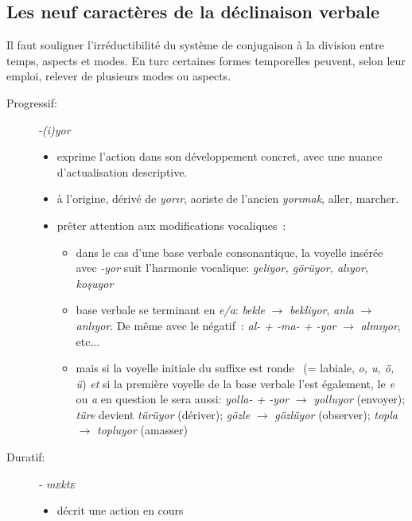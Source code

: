 \documentclass{cours}
\newcommand{\ch}{\c{s}}
\newcommand{\sce}{\textsc{e}}
\begin{document}
\subsection{Les neuf caractères de la déclinaison verbale}
Il faut souligner l'irréductibilité du système de conjugaison à la division entre temps, aspects et modes. En turc certaines formes temporelles peuvent, selon leur emploi, relever de plusieurs modes ou aspects.

\begin{description}
    \item[Progressif:] {\sl -(i)yor}
        \begin{itemize}
            \item exprime l'action dans son développement concret, avec une nuance d'actualisation descriptive.
            \item à l'origine, dérivé de \textsl{yor\i r}, aoriste de l'ancien \textsl{yor\i mak}, \og aller, marcher\fg.
            \item prêter attention aux modifications vocaliques~:
                  \begin{itemize}[label = \textbullet]
                      \item dans le cas d'une base verbale consonantique, la voyelle insérée avec \textsl{-yor} suit l'harmonie vocalique: \textsl{geliyor, görüyor, al\i yor, ko\ch uyor}
                      \item base verbale se terminant en \textsl{e/a}: \textsl{bekle} $\to$ \textsl{bekliyor}, \textsl{anla} $\to$ \textsl{anl\i yor}. De même avec le négatif~: \textsl{al- + -ma- + -yor} $\to$ \textsl{alm\i yor}, etc...
                      \item mais si la voyelle initiale du suffixe est \og ronde \fg\ (= labiale, \textsl{o, u, ö, ü}) \emph{et} si la première voyelle de la base verbale l'est également, le \textsl{e} ou {\sl a} en question le sera aussi: \textsl{yolla- + -yor} $\to$ \textsl{yolluyor} (envoyer); \textsl{türe} devient \textsl{türüyor} (dériver); \textsl{gözle} $\to$ \textsl{gözlüyor} (observer); \textsl{topla} $\to$ \textsl{topluyor} (amasser)
                  \end{itemize}
        \end{itemize}
    \item [Duratif:] {\sl - m\sce kt\sce}
          \begin{itemize}
              \item décrit une action en cours
          \end{itemize}

\end{description}
\end{document}
